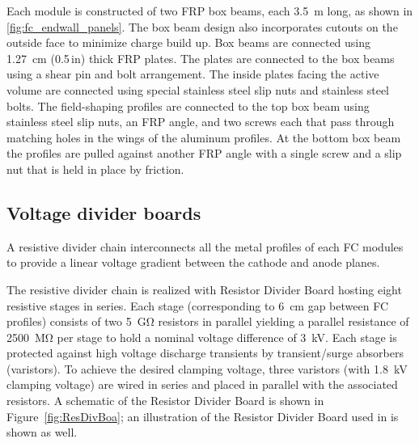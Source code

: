 Each  module is constructed of two FRP box beams, each \SI{3.5}{\m} long, as shown in \ref{fig:fc_endwall_panels}. 
The box beam design also incorporates cutouts on the outside face to minimize charge build up. Box beams are connected using \SI{1.27}{\cm} (\num{0.5}\,in) thick FRP plates. The plates are connected to the box beams using a shear pin and bolt arrangement. The inside plates facing the active volume are connected using special stainless steel slip nuts and stainless steel bolts. The field-shaping profiles are connected to the top box beam using stainless steel slip nuts, an FRP angle, and two screws each that pass through matching holes in the wings of the aluminum profiles. At the bottom box beam the profiles are pulled against another FRP angle with a single screw and a slip nut that is held in place by friction.


\subsection{Voltage divider boards}
A resistive divider chain interconnects all the metal profiles of each FC modules to provide a linear voltage gradient between the cathode and anode planes.

The resistive divider chain is realized with Resistor Divider Board hosting eight resistive stages in series. Each stage (corresponding to \SI{6}{cm} gap between FC profiles)  consists of two \SI{5}{\giga\ohm} resistors in parallel yielding a parallel resistance of \SI{2500}{\mega\ohm} per stage to hold a nominal voltage difference of \SI{3}{kV}. Each stage is protected against high voltage discharge transients by transient/surge absorbers (varistors). To achieve the desired clamping voltage, three varistors (with \SI{1.8}{kV} clamping voltage) are wired in series and placed in parallel with the associated resistors. A schematic of the Resistor Divider Board is shown in Figure~\ref{fig:ResDivBoa}; an illustration of the Resistor Divider Board used in  is shown as well.

